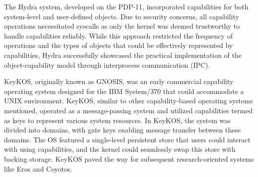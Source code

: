 The Hydra system, developed on the PDP-11, incorporated capabilities for both system-level 
and user-defined objects. Due to security concerns, all capability operations necessitated 
syscalls as only the kernel was deemed trustworthy to handle capabilities reliably. While 
this approach restricted the frequency of operations and the types of objects that 
could be effectively represented by capabilities, Hydra successfully showcased the 
practical implementation of the object-capability model through interprocess communication (IPC).


KeyKOS, originally known as GNOSIS, was an early commercial capability operating system designed 
for the IBM System/370 that could accommodate a UNIX environment. KeyKOS, similar to other 
capability-based operating systems mentioned, operated as a message-passing system and 
utilized capabilities termed as keys to represent various system resources. In KeyKOS, 
the system was divided into domains, with gate keys enabling message transfer between 
these domains. The OS featured a single-level persistent store that users could interact 
with using capabilities, and the kernel could seamlessly swap this store with backing storage. 
KeyKOS paved the way for subsequent research-oriented systems like Eros and Coyotos.


